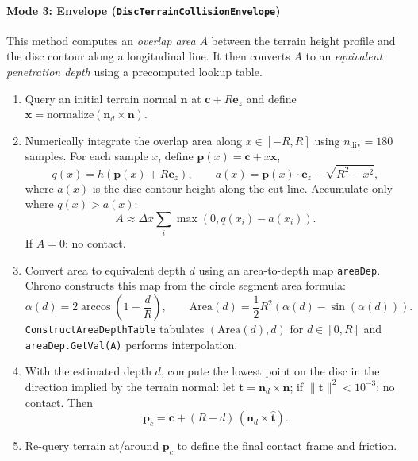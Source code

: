 \paragraph{Mode 3: Envelope (\texttt{DiscTerrainCollisionEnvelope})}
This method computes an \emph{overlap area} \(A\) between the terrain height profile and the disc contour along a
longitudinal line. It then converts \(A\) to an \emph{equivalent penetration depth} using a precomputed lookup table.

\begin{enumerate}
  \item Query an initial terrain normal \(\mathbf{n}\) at \(\mathbf{c} + R\mathbf{e}_z\) and define
    \(\mathbf{x}=\text{normalize}(\mathbf{n}_d\times \mathbf{n})\).
  \item Numerically integrate the overlap area along \(x\in[-R,R]\) using \(n_{\text{div}}=180\) samples.
        For each sample \(x\), define \(\mathbf{p}(x)=\mathbf{c}+x\mathbf{x}\),
        \[
          q(x)=h(\mathbf{p}(x) + R\mathbf{e}_z),\qquad
          a(x)=\mathbf{p}(x)\cdot\mathbf{e}_z - \sqrt{R^2-x^2},
        \]
        where \(a(x)\) is the disc contour height along the cut line. Accumulate only where \(q(x) > a(x)\):
        \[
          A \approx \Delta x\sum_i \max(0, q(x_i)-a(x_i)).
        \]
        If \(A=0\): no contact.
  \item Convert area to equivalent depth \(d\) using an area-to-depth map \texttt{areaDep}.
        Chrono constructs this map from the circle segment area formula:
        \[
          \alpha(d) = 2\arccos\!\left(1-\frac{d}{R}\right),\qquad
          \text{Area}(d)=\frac{1}{2}R^2\left(\alpha(d) - \sin(\alpha(d))\right).
        \]
        \texttt{ConstructAreaDepthTable} tabulates \((\text{Area}(d), d)\) for \(d\in[0,R]\) and \texttt{areaDep.GetVal(A)}
        performs interpolation.
  \item With the estimated depth \(d\), compute the lowest point on the disc in the direction implied by the terrain normal:
        let \(\mathbf{t} = \mathbf{n}_d\times\mathbf{n}\); if \(\lVert\mathbf{t}\rVert^2 < 10^{-3}\): no contact.
        Then
        \[
          \mathbf{p}_c = \mathbf{c} + (R-d)\,(\mathbf{n}_d \times \hat{\mathbf{t}}).
        \]
  \item Re-query terrain at/around \(\mathbf{p}_c\) to define the final contact frame and friction.
\end{enumerate}

